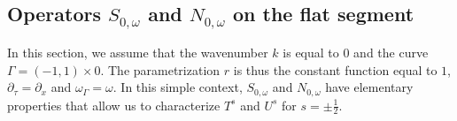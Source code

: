 \documentclass[a4paper]{article}
\begin{document}
\subsection{Operators $S_{0,\omega}$ and $N_{0,\omega}$ on the flat segment}

In this section, we assume that the wavenumber $k$ is equal to $0$ and the curve $\Gamma = (-1,1)\times{0}$. The parametrization $r$ is thus the constant function equal to $1$, $\partial_\tau = \partial_x$ and $\omega_\Gamma = \omega$. In this simple context, $S_{0,\omega}$ and $N_{0,\omega}$ have elementary properties that allow us to characterize $T^{s}$ and $U^s$ for $s = \pm \frac{1}{2}$. 
\end{document}
